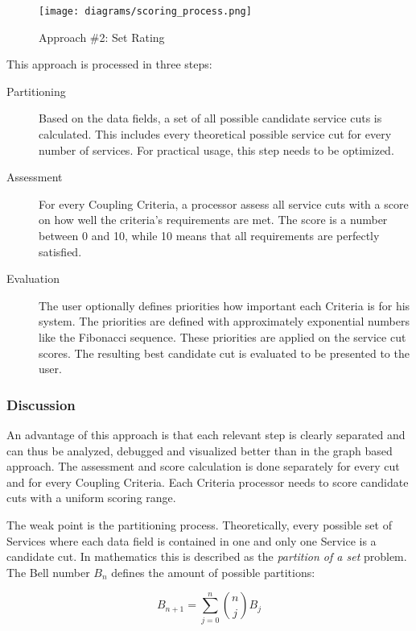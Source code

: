 \begin{figure}[H]
	\begin{center}
		\texttt{[image: diagrams/scoring\_process.png]}
	\end{center}
	\caption{Approach \#2: Set Rating}
	\label{fig:setProcess}
\end{figure}

This approach is processed in three steps:

\begin{description}
	\item[Partitioning] Based on the data fields, a set of all possible candidate service cuts is calculated. This includes every theoretical possible service cut for every number of services. For practical usage, this step needs to be optimized. 
	\item[Assessment] For every Coupling Criteria, a processor assess all service cuts with a score on how well the criteria's requirements are met. The score is a number between 0 and 10, while 10 means that all requirements are perfectly satisfied. 
	\item[Evaluation] The user optionally defines priorities how important each Criteria is for his system. The priorities are defined with approximately exponential numbers like the Fibonacci sequence. These priorities are applied on the service cut scores. The resulting best candidate cut is evaluated to be presented to the user.
\end{description}

\subsubsection{Discussion}

An advantage of this approach is that each relevant step is clearly separated and can thus be analyzed, debugged and visualized better than in the graph based approach. The assessment and score calculation is done separately for every cut and for every Coupling Criteria. Each Criteria processor needs to score candidate cuts with a uniform scoring range. 

The weak point is the partitioning process. Theoretically, every possible set of Services where each data field is contained in one and only one Service is a candidate cut. In mathematics this is described as the \textit{partition of a set}\cite{partitionOfASet} problem. The Bell number $B_n$ defines the amount of possible partitions: 


\begin{displaymath}
B_{n+1}=\sum_{j=0}^n {n\choose j} B_j
\end{displaymath}

